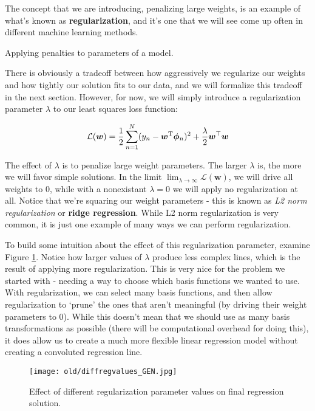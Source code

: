 The concept that we are introducing, penalizing large weights, is an example of what's known as \textbf{regularization}, and it's one that we will see come up often in different machine learning methods.

\begin{definition}[regularization]
    Applying penalties to parameters of a model.
\end{definition}

There is obviously a tradeoff between how aggressively we regularize our weights and how tightly our solution fits to our data, and we will formalize this tradeoff in the next section. However, for now, we will simply introduce a regularization parameter $\lambda$ to our least squares loss function:

\begin{equation} \label{least-squares-loss-fn-w-regularization}
    \mathcal{L}(\bm{w}) = \frac{1}{2} \sum_{n=1}^{N} (y_n - \bm{w}^{\mathrm T}\boldsymbol{\phi}_n)^2 + \frac{\lambda}{2}\bm{w}^{\top}\bm{w}
\end{equation}

The effect of $\lambda$ is to penalize large weight parameters. The larger $\lambda$ is, the more we will favor simple solutions. In the limit $\lim_{\lambda\to\infty} \mathcal{L}(\bm{w})$, we will drive all weights to 0, while with a nonexistant $\lambda = 0$ we will apply no regularization at all. Notice that we're squaring our weight parameters - this is known as \textit{L2 norm regularization} or \textbf{ridge regression}. While L2 norm regularization is very common, it is just one example of many ways we can perform regularization.

To build some intuition about the effect of this regularization parameter, examine Figure \ref{fig:ridge-reg-diff-values}. Notice how larger values of $\lambda$ produce less complex lines, which is the result of applying more regularization. This is very nice for the problem we started with - needing a way to choose which basis functions we wanted to use. With regularization, we can select many basis functions, and then allow regularization to `prune' the ones that aren't meaningful (by driving their weight parameters to 0). While this doesn't mean that we should use as many basis transformations as possible (there will be computational overhead for doing this), it does allow us to create a much more flexible linear regression model without creating a convoluted regression line.

\begin{figure}
    \centering
    \texttt{[image: old/diffregvalues\_GEN.jpg]}
    \caption{Effect of different regularization parameter values on final regression solution.}
    \label{fig:ridge-reg-diff-values}
\end{figure}

